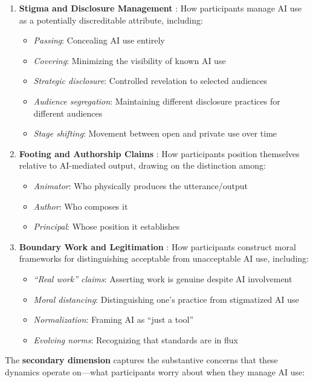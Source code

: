 \documentclass[11pt]{article}
\begin{document}
\begin{enumerate}[leftmargin=*]
\item \textbf{Stigma and Disclosure Management} \citep{goffman1963stigma}: How participants manage AI use as a potentially discreditable attribute, including:
\begin{itemize}
\item \textit{Passing}: Concealing AI use entirely
\item \textit{Covering}: Minimizing the visibility of known AI use
\item \textit{Strategic disclosure}: Controlled revelation to selected audiences
\item \textit{Audience segregation}: Maintaining different disclosure practices for different audiences
\item \textit{Stage shifting}: Movement between open and private use over time
\end{itemize}

\item \textbf{Footing and Authorship Claims} \citep{goffman1981forms}: How participants position themselves relative to AI-mediated output, drawing on the distinction among:
\begin{itemize}
\item \textit{Animator}: Who physically produces the utterance/output
\item \textit{Author}: Who composes it
\item \textit{Principal}: Whose position it establishes
\end{itemize}

\item \textbf{Boundary Work and Legitimation} \citep{goffman1959presentation}: How participants construct moral frameworks for distinguishing acceptable from unacceptable AI use, including:
\begin{itemize}
\item \textit{``Real work'' claims}: Asserting work is genuine despite AI involvement
\item \textit{Moral distancing}: Distinguishing one's practice from stigmatized AI use
\item \textit{Normalization}: Framing AI as ``just a tool''
\item \textit{Evolving norms}: Recognizing that standards are in flux
\end{itemize}
\end{enumerate}

The \textbf{secondary dimension} captures the substantive concerns that these dynamics operate on---what participants worry about when they manage AI use:
\end{document}
